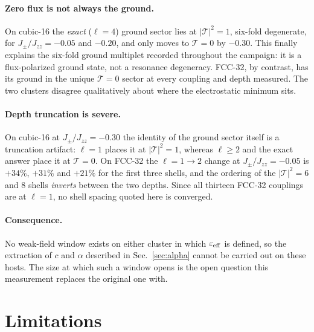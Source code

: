 \documentclass[aps,prb,preprint,amsmath,amssymb,superscriptaddress,
longbibliography,floatfix]{revtex4-2}
\newcommand{\Jzz}{J_{zz}}
\newcommand{\Jpm}{J_{\pm}}
\DeclareRobustCommand{\bT}{\bm{\mathcal T}}
\begin{document}
\paragraph{Zero flux is not always the ground.}  On cubic-16 the \emph{exact}
($\ell=4$) ground sector lies at $|\bT|^2=1$, six-fold degenerate, for
$\Jpm/\Jzz=-0.05$ and $-0.20$, and only moves to $\bT=0$ by $-0.30$.  This
finally explains the six-fold ground multiplet recorded throughout the campaign:
it is a flux-polarized ground state, not a resonance degeneracy.  FCC-32, by
contrast, has its ground in the unique $\bT=0$ sector at every coupling and
depth measured.  The two clusters disagree qualitatively about where the
electrostatic minimum sits.

\paragraph{Depth truncation is severe.}  On cubic-16 at $\Jpm/\Jzz=-0.30$ the
identity of the ground sector itself is a truncation artifact: $\ell=1$ places
it at $|\bT|^2=1$, whereas $\ell\ge2$ and the exact answer place it at
$\bT=0$.  On FCC-32 the $\ell=1\to2$ change at $\Jpm/\Jzz=-0.05$ is $+34\%$,
$+31\%$ and $+21\%$ for the first three shells, and the ordering of the
$|\bT|^2=6$ and $8$ shells \emph{inverts} between the two depths.  Since all
thirteen FCC-32 couplings are at $\ell=1$, no shell spacing quoted here is
converged.

\paragraph{Consequence.}  No weak-field window exists on either cluster in
which $\varepsilon_{\rm eff}$ is defined, so the extraction of $c$ and $\alpha$
described in Sec.~\ref{sec:alpha} cannot be carried out on these hosts.  The
size at which such a window opens is the open question this measurement
replaces the original one with.

\section{Limitations}
\end{document}
